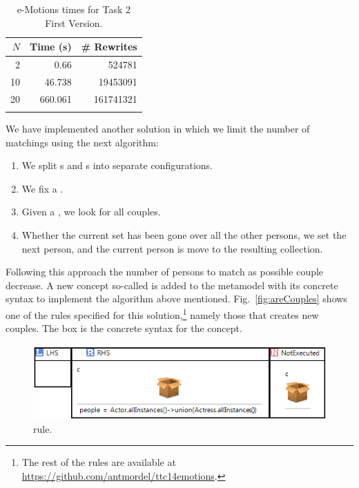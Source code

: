 \begin{table}
  \begin{center}
	\begin{tabular}{r r r}
	$N$ & Time (s) & \# Rewrites \\
	\hline
	2 & 0.66 & 524781 \\
	10 & 46.738 & 19453091 \\
	20 & 660.061 & 161741321 \\
	\hline \\
	\end{tabular}
	\caption{e-Motions times for Task 2 First Version.}\label{table:emotionstask1}
	\end{center}
\end{table}

We have implemented another solution in which we limit the number of matchings using the next algorithm:
\begin{enumerate}
  \item We split s and s into separate configurations.
  \item We fix a .
  \item Given a , we look for all couples.
  \item Whether the current  set has been gone over all the other persons, we set the next person, and the current person is move to the resulting collection.
\end{enumerate}

Following this approach the number of persons to match as possible couple decrease. A new concept so-called  is added to the metamodel with its concrete syntax to implement the algorithm above mentioned. Fig.~\ref{fig:areCouples} shows one of the rules specified for this solution,\footnote{The rest of the rules are available at \url{https://github.com/antmordel/ttc14emotions}.} namely those that creates new couples. The box is the concrete syntax for the  concept.

\begin{figure}[htp]
  \centering
  \includegraphics[width=\textwidth]{imgs/initialRule}
  \caption{ rule.}\label{fig:initialRule}
\end{figure}

